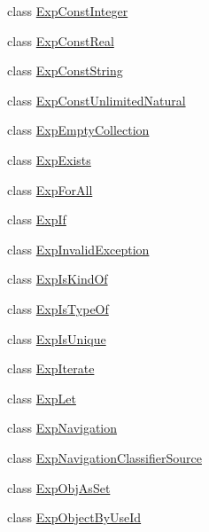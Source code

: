\begin{DoxyCompactItemize}
class \hyperlink{classorg_1_1tzi_1_1use_1_1uml_1_1ocl_1_1expr_1_1_exp_const_integer}{Exp\-Const\-Integer}
\item 
class \hyperlink{classorg_1_1tzi_1_1use_1_1uml_1_1ocl_1_1expr_1_1_exp_const_real}{Exp\-Const\-Real}
\item 
class \hyperlink{classorg_1_1tzi_1_1use_1_1uml_1_1ocl_1_1expr_1_1_exp_const_string}{Exp\-Const\-String}
\item 
class \hyperlink{classorg_1_1tzi_1_1use_1_1uml_1_1ocl_1_1expr_1_1_exp_const_unlimited_natural}{Exp\-Const\-Unlimited\-Natural}
\item 
class \hyperlink{classorg_1_1tzi_1_1use_1_1uml_1_1ocl_1_1expr_1_1_exp_empty_collection}{Exp\-Empty\-Collection}
\item 
class \hyperlink{classorg_1_1tzi_1_1use_1_1uml_1_1ocl_1_1expr_1_1_exp_exists}{Exp\-Exists}
\item 
class \hyperlink{classorg_1_1tzi_1_1use_1_1uml_1_1ocl_1_1expr_1_1_exp_for_all}{Exp\-For\-All}
\item 
class \hyperlink{classorg_1_1tzi_1_1use_1_1uml_1_1ocl_1_1expr_1_1_exp_if}{Exp\-If}
\item 
class \hyperlink{classorg_1_1tzi_1_1use_1_1uml_1_1ocl_1_1expr_1_1_exp_invalid_exception}{Exp\-Invalid\-Exception}
\item 
class \hyperlink{classorg_1_1tzi_1_1use_1_1uml_1_1ocl_1_1expr_1_1_exp_is_kind_of}{Exp\-Is\-Kind\-Of}
\item 
class \hyperlink{classorg_1_1tzi_1_1use_1_1uml_1_1ocl_1_1expr_1_1_exp_is_type_of}{Exp\-Is\-Type\-Of}
\item 
class \hyperlink{classorg_1_1tzi_1_1use_1_1uml_1_1ocl_1_1expr_1_1_exp_is_unique}{Exp\-Is\-Unique}
\item 
class \hyperlink{classorg_1_1tzi_1_1use_1_1uml_1_1ocl_1_1expr_1_1_exp_iterate}{Exp\-Iterate}
\item 
class \hyperlink{classorg_1_1tzi_1_1use_1_1uml_1_1ocl_1_1expr_1_1_exp_let}{Exp\-Let}
\item 
class \hyperlink{classorg_1_1tzi_1_1use_1_1uml_1_1ocl_1_1expr_1_1_exp_navigation}{Exp\-Navigation}
\item 
class \hyperlink{classorg_1_1tzi_1_1use_1_1uml_1_1ocl_1_1expr_1_1_exp_navigation_classifier_source}{Exp\-Navigation\-Classifier\-Source}
\item 
class \hyperlink{classorg_1_1tzi_1_1use_1_1uml_1_1ocl_1_1expr_1_1_exp_obj_as_set}{Exp\-Obj\-As\-Set}
\item 
class \hyperlink{classorg_1_1tzi_1_1use_1_1uml_1_1ocl_1_1expr_1_1_exp_object_by_use_id}{Exp\-Object\-By\-Use\-Id}

\end{DoxyCompactItemize}
